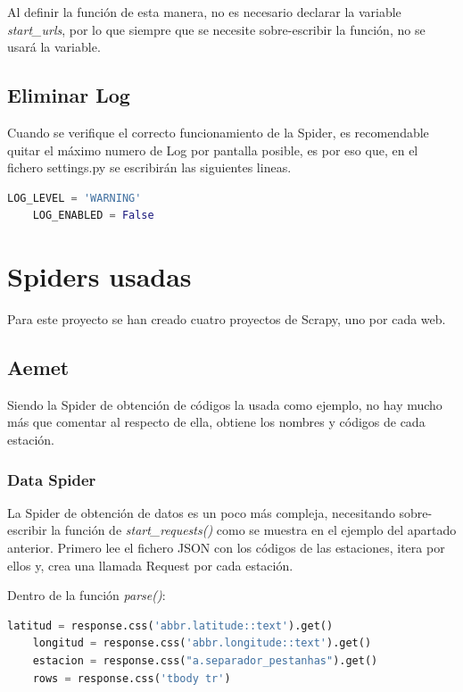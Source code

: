 Al definir la función de esta manera, no es necesario declarar la variable \textit{start\_urls}, por lo que siempre que se necesite sobre-escribir la función, no se usará la variable.

\subsection{Eliminar Log}
Cuando se verifique el correcto funcionamiento de la Spider, es recomendable quitar el máximo numero de Log por pantalla posible, es por eso que, en el fichero settings.py se escribirán las siguientes lineas.

\begin{lstlisting}[language=Python, caption={Configurar LOG}]
	LOG_LEVEL = 'WARNING'
	LOG_ENABLED = False
\end{lstlisting}

\section{Spiders usadas}
Para este proyecto se han creado cuatro proyectos de Scrapy, uno por cada web.

\subsection{Aemet}
Siendo la Spider de obtención de códigos la usada como ejemplo, no hay mucho más que comentar al respecto de ella, obtiene los nombres y códigos de cada estación.

\subsubsection{Data Spider}
La Spider de obtención de datos es un poco más compleja, necesitando sobre-escribir la función de \textit{start\_requests()} como se muestra en el ejemplo del apartado anterior. Primero lee el fichero JSON con los códigos de las estaciones, itera por ellos y, crea una llamada Request por cada estación.

Dentro de la función \textit{parse()}:

\begin{lstlisting}[language=Python, caption={Selector en \textit{parse()} de Aemet Data Spider}]
	latitud = response.css('abbr.latitude::text').get()
	longitud = response.css('abbr.longitude::text').get()
	estacion = response.css("a.separador_pestanhas").get()
	rows = response.css('tbody tr')
\end{lstlisting}

